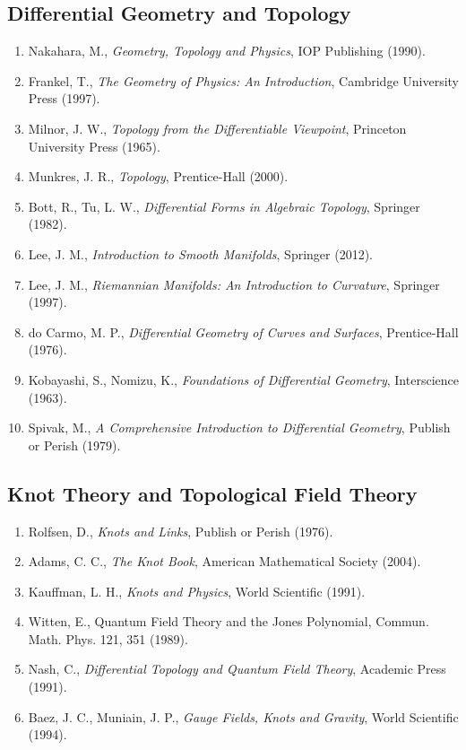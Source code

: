 \documentclass[12pt,oneside]{book}
\begin{document}
\subsection{Differential Geometry and Topology}

\begin{enumerate}
    \item Nakahara, M., \textit{Geometry, Topology and Physics}, IOP Publishing (1990).
    \item Frankel, T., \textit{The Geometry of Physics: An Introduction}, Cambridge University Press (1997).
    \item Milnor, J. W., \textit{Topology from the Differentiable Viewpoint}, Princeton University Press (1965).
    \item Munkres, J. R., \textit{Topology}, Prentice-Hall (2000).
    \item Bott, R., Tu, L. W., \textit{Differential Forms in Algebraic Topology}, Springer (1982).
    \item Lee, J. M., \textit{Introduction to Smooth Manifolds}, Springer (2012).
    \item Lee, J. M., \textit{Riemannian Manifolds: An Introduction to Curvature}, Springer (1997).
    \item do Carmo, M. P., \textit{Differential Geometry of Curves and Surfaces}, Prentice-Hall (1976).
    \item Kobayashi, S., Nomizu, K., \textit{Foundations of Differential Geometry}, Interscience (1963).
    \item Spivak, M., \textit{A Comprehensive Introduction to Differential Geometry}, Publish or Perish (1979).
\end{enumerate}

\subsection{Knot Theory and Topological Field Theory}

\begin{enumerate}
    \item Rolfsen, D., \textit{Knots and Links}, Publish or Perish (1976).
    \item Adams, C. C., \textit{The Knot Book}, American Mathematical Society (2004).
    \item Kauffman, L. H., \textit{Knots and Physics}, World Scientific (1991).
    \item Witten, E., Quantum Field Theory and the Jones Polynomial, Commun. Math. Phys. 121, 351 (1989).
    \item Nash, C., \textit{Differential Topology and Quantum Field Theory}, Academic Press (1991).
    \item Baez, J. C., Muniain, J. P., \textit{Gauge Fields, Knots and Gravity}, World Scientific (1994).
\end{enumerate}
\end{document}

